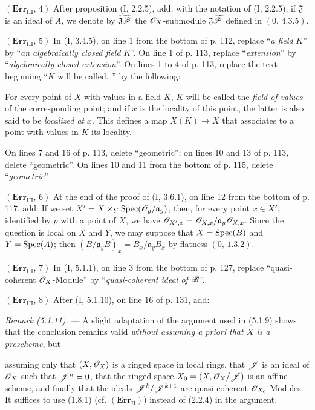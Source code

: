 \noindent\textbf{$(\mathbf{Err}_{\mathrm{III}},\,4)$} After proposition (I,
2.2.5), add: with the notation of (I, 2.2.5), if $\mathfrak J$ is an ideal of
$A$, we denote by $\widetilde{\mathfrak J\mathscr{F}}$ the
$\mathscr{O}_X$-submodule $\mathfrak J\widetilde{\mathscr{F}}$ defined in
$(0,\,4.3.5)$.

\noindent\textbf{$(\mathbf{Err}_{\mathrm{III}},\,5)$} In (I, 3.4.5), on line
1 from the bottom of p. 112, replace ``\emph{a field} $K$'' by ``\emph{an
algebraically closed field} $K$''. On line 1 of p. 113, replace
``\emph{extension}'' by ``\emph{algebraically closed extension}''. On lines 1
to 4 of p. 113, replace the text beginning ``$K$ will be called\ldots{}'' by
the following:

For every point of $X$ with values in a field $K$, $K$ will be called the
\emph{field of values} of the corresponding point; and if $x$ is the locality
of this point, the latter is also said to be \emph{localized at} $x$. This
defines a map $X(K)\to X$ that associates to a point with values in $K$ its
locality.

On lines 7 and 16 of p. 113, delete ``geometric''; on lines 10 and 13 of p.
113, delete ``geometric''. On lines 10 and 11 from the bottom of p. 115,
delete ``\emph{geometric}''.

\noindent\textbf{$(\mathbf{Err}_{\mathrm{III}},\,6)$} At the end of the proof
of (I, 3.6.1), on line 12 from the bottom of p. 117, add: If we set
$X'=X\times_Y\operatorname{Spec}(\mathscr{O}_y/\mathfrak a_y)$, then, for every point $x\in X'$,
identified by $p$ with a point of $X$, we have
$\mathscr{O}_{X',x}=\mathscr{O}_{X,x}/\mathfrak a_y\mathscr{O}_{X,x}$. Since the question is
local on $X$ and $Y$, we may suppose that $X=\operatorname{Spec}(B)$ and $Y=\operatorname{Spec}(A)$; then
$(B/\mathfrak a_yB)_x=B_x/\mathfrak a_yB_x$ by flatness $(0,\,1.3.2)$.

\noindent\textbf{$(\mathbf{Err}_{\mathrm{III}},\,7)$} In (I, 5.1.1), on line
3 from the bottom of p. 127, replace ``quasi-coherent $\mathscr{O}_X$-Module'' by
``\emph{quasi-coherent ideal of} $\mathscr{B}$''.

\noindent\textbf{$(\mathbf{Err}_{\mathrm{III}},\,8)$} After (I, 5.1.10), on
line 16 of p. 131, add:

\emph{Remark (5.1.11).} --- A slight adaptation of the argument used in
(5.1.9) shows that the conclusion remains valid \emph{without assuming a
priori that $X$ is a prescheme}, but

assuming only that $(X,\mathscr{O}_X)$ is a ringed space in local rings, that
$\mathscr{J}$ is an ideal of $\mathscr{O}_X$ such that $\mathscr{J}^n=0$, that the ringed
space $X_0=(X,\mathscr{O}_X/\mathscr{J})$ is an affine scheme, and finally that the
ideals $\mathscr{J}^k/\mathscr{J}^{k+1}$ are quasi-coherent $\mathscr{O}_{X_0}$-Modules. It
suffices to use (1.8.1) (cf. $(\mathbf{Err}_{\mathrm{II}})$) instead of
(2.2.4) in the argument.

